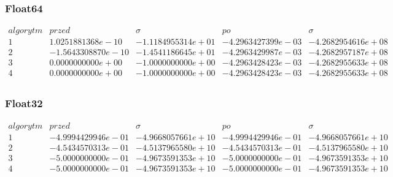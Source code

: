\subsubsection*{Float64}
$$
\begin{array}{c|c|c|c|c}
algorytm & przed & \sigma & po & \sigma\\
\hline
1 & 1.0251881368e-10 & -1.1184955314e+01 & -4.2963427399e-03 & -4.2682954616e+08 \\
2 & -1.5643308870e-10 & -1.4541186645e+01 & -4.2963429987e-03 & -4.2682957187e+08 \\
3 & 0.0000000000e+00 & -1.0000000000e+00 & -4.2963428423e-03 & -4.2682955633e+08 \\
4 & 0.0000000000e+00 & -1.0000000000e+00 & -4.2963428423e-03 & -4.2682955633e+08 \\
\end{array}
$$
\subsubsection*{Float32}
$$
\begin{array}{c|c|c|c|c}
algorytm & przed & \sigma & po & \sigma\\
\hline
1 & -4.9994429946e-01 & -4.9668057661e+10 & -4.9994429946e-01 & -4.9668057661e+10 \\
2 & -4.5434570313e-01 & -4.5137965580e+10 & -4.5434570313e-01 & -4.5137965580e+10 \\
3 & -5.0000000000e-01 & -4.9673591353e+10 & -5.0000000000e-01 & -4.9673591353e+10 \\
4 & -5.0000000000e-01 & -4.9673591353e+10 & -5.0000000000e-01 & -4.9673591353e+10 \\
\end{array}
$$

